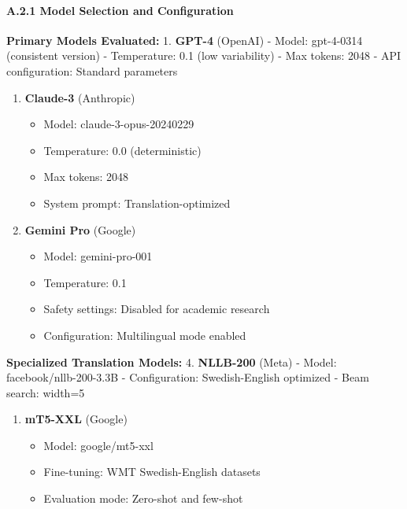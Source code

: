 \documentclass[12pt,a4paper]{article}
\providecommand{\tightlist}{%
  \setlength{\itemsep}{0pt}\setlength{\parskip}{0pt}}
\begin{document}
{{{{{\hypertarget{a.2.1-model-selection-and-configuration}{%
\paragraph{A.2.1 Model Selection and
Configuration}\label{a.2.1-model-selection-and-configuration}}

\textbf{Primary Models Evaluated:} 1. \textbf{GPT-4} (OpenAI) - Model:
gpt-4-0314 (consistent version) - Temperature: 0.1 (low variability) -
Max tokens: 2048 - API configuration: Standard parameters

\begin{enumerate}
\def\labelenumi{\arabic{enumi}.}
\setcounter{enumi}{1}
\tightlist
\item
  \textbf{Claude-3} (Anthropic)

  \begin{itemize}
  \tightlist
  \item
    Model: claude-3-opus-20240229
  \item
    Temperature: 0.0 (deterministic)
  \item
    Max tokens: 2048
  \item
    System prompt: Translation-optimized
  \end{itemize}
\item
  \textbf{Gemini Pro} (Google)

  \begin{itemize}
  \tightlist
  \item
    Model: gemini-pro-001
  \item
    Temperature: 0.1
  \item
    Safety settings: Disabled for academic research
  \item
    Configuration: Multilingual mode enabled
  \end{itemize}
\end{enumerate}

\textbf{Specialized Translation Models:} 4. \textbf{NLLB-200} (Meta) -
Model: facebook/nllb-200-3.3B - Configuration: Swedish-English optimized
- Beam search: width=5

\begin{enumerate}
\def\labelenumi{\arabic{enumi}.}
\setcounter{enumi}{4}
\tightlist
\item
  \textbf{mT5-XXL} (Google)

  \begin{itemize}
  \tightlist
  \item
    Model: google/mt5-xxl
  \item
    Fine-tuning: WMT Swedish-English datasets
  \item
    Evaluation mode: Zero-shot and few-shot
  \end{itemize}
\end{enumerate}

}}}}}
\end{document}
